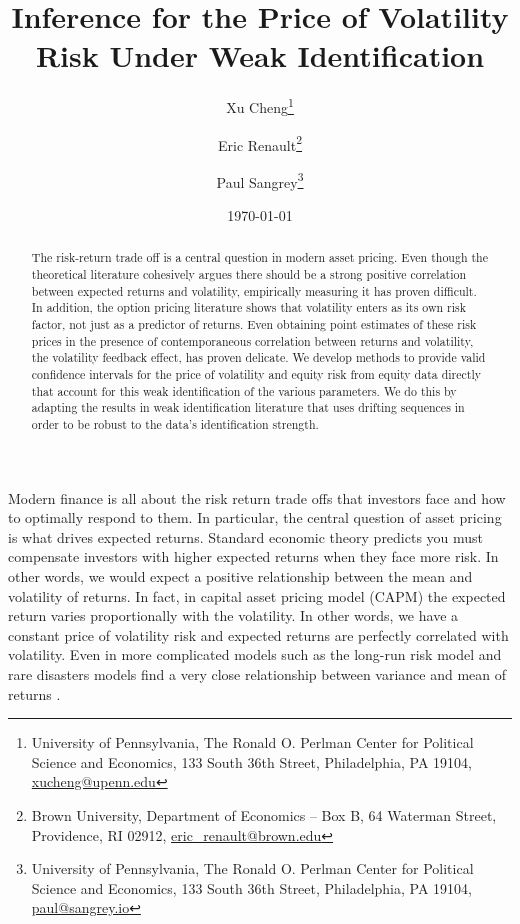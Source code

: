 \documentclass[11pt, letterpaper, twoside, final]{article}
\author{Xu Cheng\thanks{University of Pennsylvania, The Ronald O. Perlman Center for Political Science and
    Economics, 133 South 36th Street, Philadelphia, PA 19104, \href{mailto:xucheng@upenn.edu}{xucheng@upenn.edu}}
    \and 
    Eric Renault\thanks{Brown University, Department of Economics -- Box B, 64 Waterman Street, Providence, RI
    02912, \href{mailto:eric_renault@brown.edu}{eric\_renault@brown.edu}}
    \and 
    Paul Sangrey\thanks{University of Pennsylvania, The Ronald O. Perlman Center for Political Science and
    Economics, 133 South 36th Street, Philadelphia, PA 19104, \href{mailto:paul@sangrey.io}{paul@sangrey.io}}}
\title{Inference for the Price of Volatility Risk Under Weak Identification}
\date{\today}
\begin{document}
\begin{titlepage}


    \maketitle
    \thispagestyle{empty}
    \addtocounter{page}{-1}

    \begin{abstract} \singlespacing \noindent 
        The risk-return trade off is a central question in modern asset pricing. 
        Even though the theoretical literature cohesively argues there should be a strong positive correlation
        between expected returns and volatility, empirically measuring it has proven difficult. 
        In addition, the option pricing literature shows that volatility enters as its own risk factor, not just
        as a predictor of returns.
        Even obtaining point estimates of these risk prices in the presence of contemporaneous correlation between
        returns and volatility, the  volatility feedback effect, has proven delicate.
        We develop methods to provide  valid confidence intervals for the price of volatility and equity risk from
        equity data directly that account for this weak identification of the various parameters. 
        We do this by adapting the results in weak identification literature that uses drifting sequences in order
        to be robust to the data's identification strength. 
    \end{abstract}



\end{titlepage}

{}

Modern finance is all about the risk return trade offs that investors face and how to optimally respond to them. 
In particular, the central question of asset pricing is what drives expected returns.
Standard economic theory predicts you must compensate investors with higher expected returns when they face more
risk.
In other words, we would expect a positive relationship between the mean and volatility of returns.
In fact, in  capital asset pricing model (CAPM) the expected
return varies proportionally with the volatility. 
In other words, we have a constant price of volatility risk and expected returns are perfectly correlated with
volatility.
Even in more complicated models such as the long-run risk model and rare disasters models find a very close
relationship between variance and mean of returns \parencite{bansal2014volatility, wachter2013can}.
\end{document}
